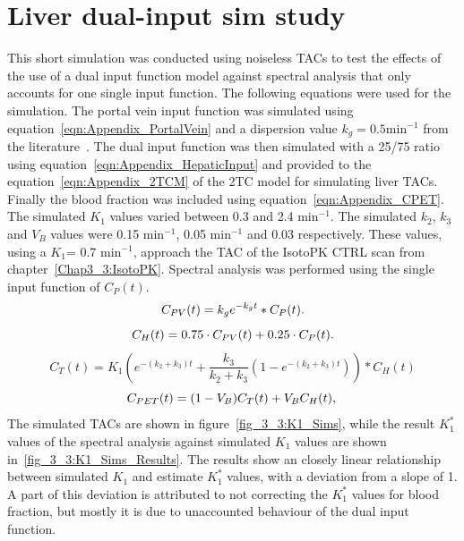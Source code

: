 \section{Liver dual-input sim study}
This short simulation was conducted using noiseless TACs to test the effects of the use of a dual input function model against spectral analysis that only accounts for one single input function.  
The following equations were used for the simulation. The portal vein input function was simulated using equation~\ref{eqn:Appendix_PortalVein} and a dispersion value $k_g=0.5 \mathrm{min}^{-1}$ from the literature~\cite{Kudomi2008}.
The dual input function was then simulated with a 25/75 ratio using equation~\ref{eqn:Appendix_HepaticInput} and provided to the equation~\ref{eqn:Appendix_2TCM} of the 2TC model for simulating liver TACs. Finally the blood fraction was included using equation~\ref{eqn:Appendix_CPET}. The simulated $K_1$ values varied between 0.3 and 2.4 min$^{-1}$. The simulated $k_2$, $k_3$ and $V_B$ values were 0.15 min$^{-1}$, 0.05 min$^{-1}$ and 0.03 respectively. These values, using a $K_1$= 0.7 min$^{-1}$, approach the TAC of the IsotoPK CTRL scan from chapter~\ref{Chap3_3:IsotoPK}. 
Spectral analysis was performed using the single input function of $C_{P}(t)$. 
%
\begin{equation} 
{C_{PV}}(t)  = {k_g} e^{-k_g t} \ast C_P(t)   \\ . \\
\label{eqn:Appendix_PortalVein}
\end{equation}
%
\begin{equation} 
{C_{H}}(t)  = 0.75 \cdot C_{PV}(t) + 0.25 \cdot C_{P}(t)  \\ . \\
\label{eqn:Appendix_HepaticInput}
\end{equation}
%
\begin{equation}
C_T(t) = K_1 ( e^{-(k_2+k_3)t} + \frac{k_3}{k_2+k_3}(1-e^{-(k_2+k_3)t})) \ast C_{H}(t)   
\label{eqn:Appendix_2TCM}
\end{equation}
%
\begin{equation}
{C_{PET}}(t)  = (1-V_{B}){C_{T}}(t) + V_{B}C_{H}(t) \\ , \\
\label{eqn:Appendix_CPET}
\end{equation}
%
%
The simulated TACs are shown in figure~\ref{fig_3_3:K1_Sims}, while the result $K_1^{*}$ values of the spectral analysis against simulated $K_1$ values are shown in~\ref{fig_3_3:K1_Sims_Results}. The results show an closely linear relationship between simulated $K_1$ and estimate $K_1^{*}$ values, with a deviation from a slope of 1. A part of this deviation is attributed to not correcting the $K_1^{*}$ values for blood fraction, but mostly it is due to unaccounted behaviour of the dual input function.
